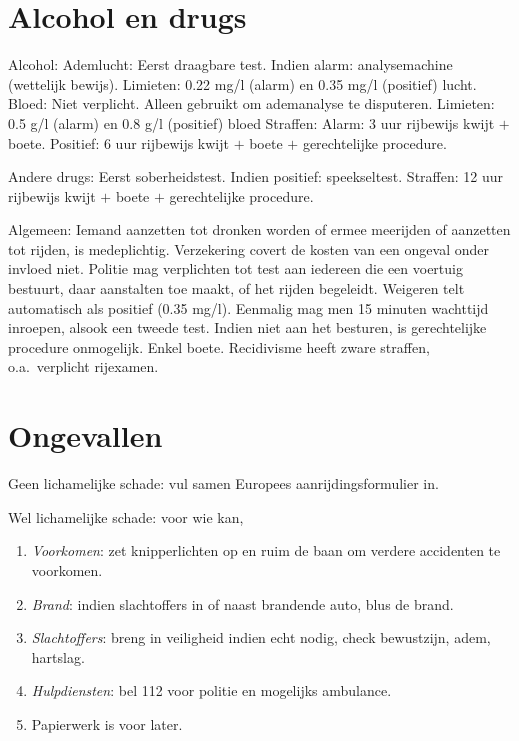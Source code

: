 \section{Alcohol en drugs}
\begin{outline}
\1 Alcohol:
	\2 Ademlucht:
		\3 Eerst draagbare test. Indien alarm: analysemachine (wettelijk bewijs).
		\3 Limieten: 0.22 mg/l (alarm) en 0.35 mg/l (positief) lucht.
	\2 Bloed:
		\3 Niet verplicht. Alleen gebruikt om ademanalyse te disputeren.
		\3 Limieten: 0.5 g/l (alarm) en 0.8 g/l (positief) bloed
	\2 Straffen:
		\3 Alarm: 3 uur rijbewijs kwijt $+$ boete.
		\3 Positief: 6 uur rijbewijs kwijt $+$ boete $+$ gerechtelijke procedure.
		
\1 Andere drugs:
	\2 Eerst soberheidstest. Indien positief: speekseltest.
	\2 Straffen: 12 uur rijbewijs kwijt $+$ boete $+$ gerechtelijke procedure.
	
\1 Algemeen:
	\2 Iemand aanzetten tot dronken worden of ermee meerijden of aanzetten tot rijden, is medeplichtig.
	\2 Verzekering covert de kosten van een ongeval onder invloed niet.
	\2 Politie mag verplichten tot test aan iedereen die een voertuig bestuurt, daar aanstalten toe maakt, of het rijden begeleidt.
		\3 Weigeren telt automatisch als positief (0.35 mg/l).
		\3 Eenmalig mag men 15 minuten wachttijd inroepen, alsook een tweede test.
		\3 Indien niet aan het besturen, is gerechtelijke procedure onmogelijk. Enkel boete.
	\2 Recidivisme heeft zware straffen, o.a.\ verplicht rijexamen.
\end{outline}

\section{Ongevallen}
\begin{outline}
\1 Geen lichamelijke schade: vul samen Europees aanrijdingsformulier in.

\1 Wel lichamelijke schade: voor wie kan,
\begin{enumerate}
	\item \emph{Voorkomen}: zet knipperlichten op en ruim de baan om verdere accidenten te voorkomen.
	\item \emph{Brand}: indien slachtoffers in of naast brandende auto, blus de brand.
	\item \emph{Slachtoffers}: breng in veiligheid indien echt nodig, check bewustzijn, adem, hartslag.
	\item \emph{Hulpdiensten}: bel 112 voor politie en mogelijks ambulance.
	\item Papierwerk is voor later.
\end{enumerate}

\end{outline}

